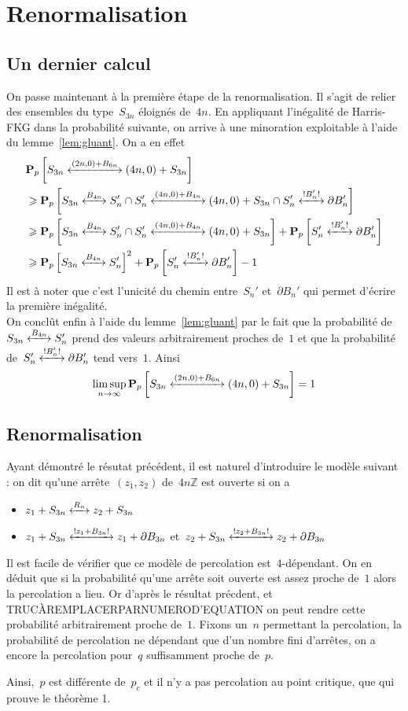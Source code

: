 \section{Renormalisation}
	\subsection{Un dernier calcul}
		On passe maintenant à la première étape de la renormalisation. Il s'agit de relier des ensembles du type~$S_{3n}$ éloignés de~$4n$. En appliquant l'inégalité de Harris-FKG dans la probabilité suivante, on arrive à une minoration exploitable à l'aide du lemme~\ref{lem:gluant}. On a en effet 
		\begin{align*}
			& \Pp{\relie[(2n, 0) + B_{6n}]{S_{3n}}{(4n, 0) + S_{3n}}}  \\
			& \geq \Pp{ \relie[B_{4n}]{S_{3n}}{S_n'} \cap \relie[(4n, 0) + B_{4n}]{S_n'}{(4n, 0) + S_{3n}} \cap \relie*[B_n']{S_n'}{\partial B_n'} } \\
			& \geq \Pp{ \relie[B_{4n}]{S_{3n}}{S_n'} \cap \relie[(4n, 0) + B_{4n}]{S_n'}{(4n, 0) + S_{3n}}} + \Pp{\relie*[B_n']{S_n'}{\partial B_n'}} \\ 
			& \geq \Pp{ \relie[B_{4n}]{S_{3n}}{S_n'} }^2 + \Pp{\relie*[B_n']{S_n'}{\partial B_n'}}  - 1
		\end{align*}
		Il est à noter que c'est l'unicité du chemin entre~$S_n'$ et~$\partial B_n'$ qui permet d'écrire la première inégalité. \\
		On conclût enfin à l'aide du lemme~\ref{lem:gluant} par le fait que la probabilité de~$\relie[B_{4n}]{S_{3n}}{S_n'}$ prend des valeurs arbitrairement proches de~$1$ et que la probabilité de~$\relie*[B_n']{S_n'}{\partial B_n'}$ tend vers~$1$. Ainsi
			\[
				\limsup_{n \to \infty} \Pp{\relie[(2n, 0) + B_{6n}]{S_{3n}}{(4n, 0) + S_{3n}}} = 1
			\]
	
	\subsection{Renormalisation}
	Ayant démontré le résutat précédent, il est naturel d'introduire le modèle suivant : on dit qu'une arrête~$(z_1, z_2)$ de~$4n\mathbb{Z}$ est ouverte si on a
		\begin{itemize}
			\item $\relie[R_n]{z_1 + S_{3n}}{z_2 + S_{3n}}$
			\item $\relie*[z_1 + B_{3n}]{z_1 + S_{3n}}{z_1 + \partial B_{3n}}$ et~$\relie*[z_2 + B_{3n}]{z_2 + S_{3n}}{z_2 + \partial B_{3n}}$ 
		\end{itemize}
	Il est facile de vérifier que ce modèle de percolation est~$4$-dépendant. On en déduit que si la probabilité qu'une arrête soit ouverte est assez proche de~$1$ alors la percolation a lieu. Or d'après le résultat précdent, et TRUCÀREMPLACERPARNUMEROD'EQUATION on peut rendre cette probabilité arbitrairement proche de~$1$. Fixons un~$n$ permettant la percolation, la probabilité de percolation ne dépendant que d'un nombre fini d'arrêtes, on a encore la percolation pour~$q$ suffisamment proche de~$p$.

	Ainsi,~$p$ est différente de~$p_c$ et il n'y a pas percolation au point critique, que qui prouve le théorème 1.
